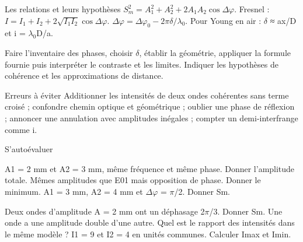 \begin{loi}{Les relations et leurs hypothèses}
$S_m^2=A_1^2+A_2^2+2A_1A_2\cos\Delta\varphi$. Fresnel : $I=I_1+I_2+2\sqrt{I_1I_2}\cos\Delta\varphi$. $\Delta\varphi=\Delta\varphi_0-2\pi\delta/\lambda_0$. Pour Young en air : \ensuremath{\delta} ≈ ax/D et i = \ensuremath{\lambda_0}D/a.
\end{loi}
Faire l’inventaire des phases, choisir \ensuremath{\delta}, établir la géométrie, appliquer la formule fournie puis interpréter le contraste et les limites. Indiquer les hypothèses de cohérence et les approximations de distance.
\begin{piege}{Erreurs à éviter}
Additionner les intensités de deux ondes cohérentes sans terme croisé ; confondre chemin optique et géométrique ; oublier une phase de réflexion ; annoncer une annulation avec amplitudes inégales ; compter un demi-interfrange comme i.
\end{piege}
\begin{docu}{S’autoévaluer}
\end{docu}


A1 = 2 mm et A2 = 3 mm, même fréquence et même phase. Donner l’amplitude totale.
Mêmes amplitudes que E01 mais opposition de phase. Donner le minimum.
A1 = 3 mm, A2 = 4 mm et \ensuremath{\Delta}\ensuremath{\varphi} = \ensuremath{\pi}/2. Donner Sm.


Deux ondes d’amplitude A = 2 mm ont un déphasage 2\ensuremath{\pi}/3. Donner Sm.
Une onde a une amplitude double d’une autre. Quel est le rapport des intensités dans le même modèle ?
I1 = 9 et I2 = 4 en unités communes. Calculer Imax et Imin.


